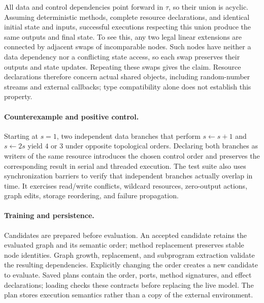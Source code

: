 All data and control dependencies point forward in $\tau$, so their union is
acyclic. Assuming deterministic methods, complete resource declarations, and
identical initial state and inputs, successful executions respecting this union
produce the same outputs and final state. To see this, any two legal linear
extensions are connected by adjacent swaps of incomparable nodes. Such nodes
have neither a data dependency nor a conflicting state access, so each swap
preserves their outputs and state updates. Repeating these swaps gives the
claim. Resource declarations therefore concern actual shared objects, including
random-number streams and external callbacks; type compatibility alone does
not establish this property.

\paragraph{Counterexample and positive control.}
Starting at $s=1$, two independent data branches that perform $s\leftarrow s+1$
and $s\leftarrow 2s$ yield $4$ or $3$ under opposite topological orders.
Declaring both branches as writers of the same resource introduces the chosen
control order and preserves the corresponding result in serial and threaded
execution. The test suite also uses synchronization barriers to verify that
independent branches actually overlap in time. It exercises read/write
conflicts, wildcard resources, zero-output actions, graph edits, storage
reordering, and failure propagation.

\paragraph{Training and persistence.}
Candidates are prepared before evaluation. An accepted candidate retains the
evaluated graph and its semantic order; method replacement preserves stable
node identities. Graph growth, replacement, and subprogram extraction validate
the resulting dependencies. Explicitly changing the order creates a new
candidate to evaluate. Saved plans contain the order, ports, method signatures,
and effect declarations; loading checks these contracts before replacing the
live model. The plan stores execution semantics rather than a copy of the
external environment.

